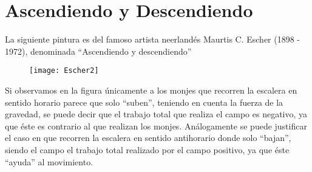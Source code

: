 \documentclass[10pt]{article}
\begin{document}
\bigskip


\bigskip


\bigskip

\tableofcontents{}
\pagebreak

\section{Ascendiendo y Descendiendo}
	La siguiente pintura  es del famoso artista neerlandés Maurtis C. Escher (1898 - 1972), denominada “Ascendiendo y descendiendo”
	\begin{figure}[h]
	\texttt{[image: Escher2]}
	\centering
	\end{figure}
	Si observamos en la figura únicamente a los monjes que recorren la escalera en sentido horario parece que solo “suben”, teniendo en cuenta la fuerza de la gravedad, se puede decir que el trabajo total que realiza el campo es negativo, ya que éste es contrario al que realizan los monjes. Análogamente se puede justificar el caso en que recorren la escalera en sentido antihorario donde solo “bajan”, siendo el campo el trabajo total realizado por el campo positivo, ya que éste “ayuda” al movimiento. 
\end{document}
